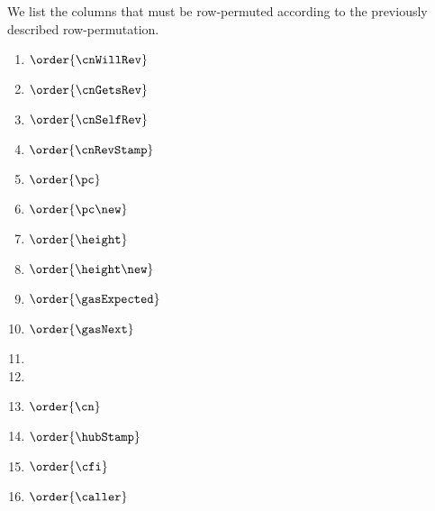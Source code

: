 We list the columns that must be row-permuted according to the previously described row-permutation.
\begin{multicols}{4}
	\begin{enumerate}
		\item $\order{\cnWillRev}$
		\item $\order{\cnGetsRev}$
		\item $\order{\cnSelfRev}$
		\item $\order{\cnRevStamp}$
		\item $\order{\pc}$
		\item $\order{\pc\new}$
		\item $\order{\height}$
		\item $\order{\height\new}$
		\item $\order{\gasExpected}$
		\item $\order{\gasNext}$
		\item[\vspace{\fill}]
		\item[\vspace{\fill}]
		\item $\order{\cn}$
		\item $\order{\hubStamp}$
		\item $\order{\cfi}$
		\item $\order{\caller}$
	\end{enumerate}
\end{multicols}
